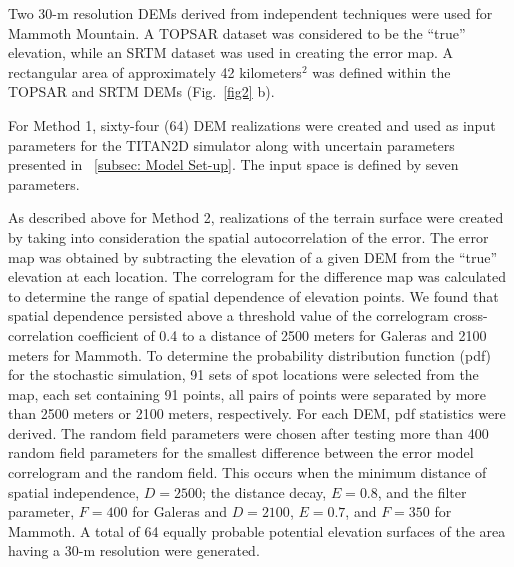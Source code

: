 \documentclass[12pt]{article}
\begin{document}
Two 30-m resolution DEMs derived from independent techniques were used
for Mammoth Mountain.  A TOPSAR dataset was considered to be the
``true'' elevation, while an SRTM dataset was used in creating the
error map.  A rectangular area of approximately 42 kilometers$^2$ was
defined within the TOPSAR and SRTM DEMs (Fig.~\ref{fig2} b).

For Method 1, sixty-four (64) DEM realizations were created and used
as input parameters for the TITAN2D simulator along with uncertain
parameters presented in ~\ref{subsec: Model Set-up}.  The input space is defined
by seven parameters.



As described above for Method 2, realizations of the terrain surface
were created by taking into consideration the spatial autocorrelation
of the error.  The error map was obtained by subtracting the elevation
of a given DEM from the ``true'' elevation at each location. The
correlogram for the difference map was calculated to determine the
range of spatial dependence of elevation points. We found that spatial
dependence persisted above a threshold value of the correlogram
cross-correlation coefficient of 0.4 to a distance of 2500 meters for
Galeras and 2100 meters for Mammoth. To determine the probability
distribution function (pdf) for the stochastic simulation, 91 sets of
spot locations were selected from the map, each set containing 91
points, all pairs of points were separated by more than 2500 meters or
2100 meters, respectively. For each DEM, pdf statistics were derived.
The random field parameters were chosen after testing more than 400
random field parameters for the smallest difference between the error
model correlogram and the random field.  This occurs when the minimum
distance of spatial independence, $D =2500$; the distance decay, $E =
0.8$, and the filter parameter, $F =400$ for Galeras and $D =2100$, $E
= 0.7$, and $F =350$ for Mammoth.  A total of 64 equally probable
potential elevation surfaces of the area having a 30-m resolution were
generated.
\end{document}
